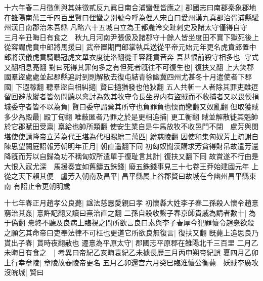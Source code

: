 十六年春二月徵側與其妹徵貳反九眞日南合浦蠻俚皆應之|{
	郡國志曰南郡秦象郡地在雒陽南萬三千四百里賢曰俚蠻之别號今呼為俚人宋白曰愛州漢九真郡治胥浦縣驩州漢日南郡治朱吾縣}
凡略六十五城自立為王都麊泠交趾刺史及諸太守僅得自守　三月辛丑晦日有食之　秋九月河南尹張伋及諸郡守十餘人皆坐度田不實下獄死後上從容謂虎賁中郎將馬援曰|{
	武帝置期門郎掌執兵送從平帝元始元年更名虎賁郎置中郎將漢儀虎賁騎鶡冠虎文單衣度徒洛翻從千容翻賁音奔}
吾甚恨前殺守相多也|{
	守式又翻相息亮翻}
對曰死得其罪何多之有但死者旣往不可復生也|{
	復扶又翻}
上大笑郡國羣盜處處並起郡縣追討到則解散去復屯結青徐幽冀四州尤甚冬十月遣使者下郡國|{
	下遐稼翻}
聽羣盜自相糾擿|{
	賢曰擿猶發也他狄翻}
五人共斬一人者除其罪吏雖逗留回避故縱者皆勿問聽以禽討為效其牧守令長坐界内有盜賊而不收捕者又以畏愞捐城委守者皆不以為負|{
	賢曰委守謂棄其所守也負罪負也愞而戀翻又奴亂翻}
但取獲賊多少為殿最|{
	殿丁甸翻}
唯蔽匿者乃罪之於是更相追捕|{
	更工衡翻}
賊並解散徙其魁帥於它郡賦田受禀|{
	禀給也帥所類翻}
使安生業自是牛馬放牧不收邑門不閉　盧芳與閔堪使使請降帝立芳為代王堪為代相賜繒二萬匹|{
	繒慈陵翻}
因使和集匈奴芳上疏謝自陳思望闕庭詔報芳朝明年正月|{
	朝直遥翻下同}
初匈奴聞漢購求芳貪得財帛故遣芳還降旣而芳以自歸為功不稱匈奴所遣單于復耻言其計|{
	復扶又翻下同}
故賞遂不行由是大恨入寇尤深　馬援奏宜如舊鑄五銖錢|{
	廢五銖錢事見三十七卷王莽始建國元年}
上從之天下賴其便　盧芳入朝南及昌平|{
	昌平縣属上谷郡賢曰故城在今幽州昌平縣東南}
有詔止令更朝明歲

十七年春正月趙孝公良薨|{
	諡法慈惠愛親曰孝}
初懷縣大姓李子春二孫殺人懷令趙憙窮治其姦|{
	憙許記翻又讀曰熹治直之翻}
二孫自殺收繫子春京師貴戚為請者數十|{
	為于偽翻}
憙終不聽及良病上臨視之問所欲言良曰素與李子春厚今犯罪懷令趙憙欲殺之願乞其命帝曰吏奉法律不可枉也更道它所欲良無復言|{
	復扶又翻}
旣薨上追思良乃貰出子春|{
	貰時夜翻赦也}
遷憙為平原太守|{
	郡國志平原郡在雒陽北千三百里}
二月乙未晦日有食之　|{
	考異曰帝紀乙亥晦袁紀乙未據長歷三月丙申朔帝紀誤}
夏四月乙卯上行幸章陵|{
	章陵故舂陵帝更名}
五月乙卯還宫六月癸巳臨淮懷公衡薨　妖賊李廣攻沒皖城|{
	賢曰}


